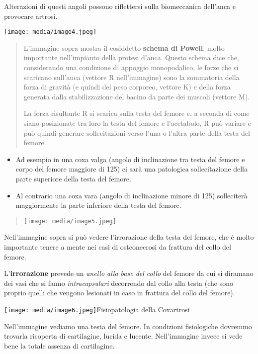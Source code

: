 \documentclass[]{article}
\begin{document}
Alterazioni di questi angoli possono riflettersi sulla biomeccanica
dell'anca e provocare artrosi.

\texttt{[image: media/image4.jpeg]}

\begin{quote}
L'immagine sopra mostra il cosiddetto \textbf{schema di Powell}, molto
importante nell'impianto della protesi d'anca. Questo schema dice che,
considerando una condizione di appoggio monopodalico, le forze che si
scaricano sull'anca (vettore R nell'immagine) sono la sommatoria della
forza di gravità (e quindi del peso corporeo, vettore K) e della forza
generata dalla stabilizzazione del bacino da parte dei muscoli (vettore
M).

La forza risultante R si scarica sulla testa del femore e, a seconda di
come siano posizionate tra loro la testa del femore e l'acetabolo, R può
variare e può quindi generare sollecitazioni verso l'una o l'altra parte
della testa del femore.
\end{quote}

\begin{itemize}
\item
  Ad esempio in una coxa valga (angolo di inclinazione tra testa del
  femore e corpo del femore maggiore di 125\(\)) ci sarà una patologica
  sollecitazione della parte superiore della testa del femore.
\item
  Al contrario una coxa vara (angolo di inclinazione minore di 125\(\))
  solleciterà maggiormente la parte inferiore della testa del femore.
\end{itemize}

\begin{quote}
\texttt{[image: media/image5.jpeg]}
\end{quote}

Nell'immagine sopra si può vedere l'irrorazione della testa del femore,
che è molto importante tenere a mente nei casi di osteonecrosi da
frattura del collo del femore.

L'\textbf{irrorazione} prevede un \emph{anello alla base del collo} del
femore da cui si diramano dei vasi che si fanno \emph{intracapsulari}
decorrendo dal collo alla testa (che sono proprio quelli che vengono
lesionati in caso in frattura del collo del femore).

\texttt{[image: media/image6.jpeg]}Fisiopatologia
della Coxartrosi

Nell'immagine vediamo una testa del femore. In condizioni fisiologiche
dovremmo trovarla ricoperta di cartilagine, lucida e lucente.
Nell'immagine invece si vede bene la totale assenza di cartilagine.
\end{document}
